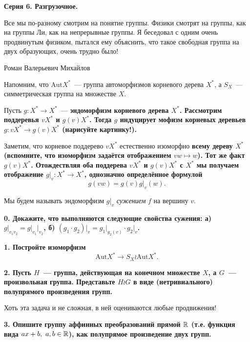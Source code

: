 \documentclass[11pt]{extarticle}
\begin{document}
\begin{landscape}
\begin{multicols}{2}
	\columnbreak

	\centerline{\bf{Серия 6. Разгрузочное. }}


	\epigraph{Все мы по-разному смотрим на понятие группы. Физики смотрят на группы, как на группы Ли, как на непрерывные группы. Я беседовал с одним очень продвинутым физиком, пытался ему объяснить, что такое свободная группа на двух образующих, очень трудно было!}{Роман Валерьевич Михайлов}

	Напомним, что $\mathrm{Aut}{X^*}$~--- группа автоморфизмов корневого дерева $X^*$, а $S_{X}$~---  симметрическая группа на множестве $X$.

	Пусть $g\colon X^* \to X^*$~--- \bf{эндоморфизм} корневого дерева $X^*$. Рассмотрим поддеревья $v X^*$ и $g(v) X^*$. Тогда $g$ индуцирует мофизм корневых деревьев $g\colon v X^* \to g(v) X^*$ (\bf{нарисуйте картинку!}). 

	Заметим, что корневое поддерево $v X^*$ естественно изоморфно \bf{всему} дереву $X^*$ (вспомните, что изоморфизм задаётся отображением $vw \mapsto w$). Тот же факт $g(v)X^*$. Отождествляя оба поддерева $v X^*$ и $g(v) X^*$ с $X^*$ мы получаем отображение $g\vert_{v} \colon X^* \to X^*$, однозначно определённое формулой 
	\[
		g(vw) = g(v) g\vert_{v}(w).
	\]

	Мы будем называть эндоморфизм $g\vert_{v}$ \emph{сужением} $f$ на вершину $v$.

	\bf{0.} Докажите, что выполняются следующие свойства сужения: а) $g\vert_{v_1 v_2} = g\vert_{v_1}\vert_{v_2}$, б) $(g_1 \cdot g_2)\vert_{v} = g_1\vert_{g_2(v)} \cdot g_2\vert_{v}$. 

	\bf{1.} Постройте изоморфизм 
	\[
		\mathrm{Aut}{X^*} \to S_{X} \wr \mathrm{Aut}{X^*}. 
	\]

	\bf{2.} Пусть $H$~--- группа, действующая на конечном множестве $X$, а $G$~--- произвольная группа. Представьте $H \wr G$ в виде (нетривиального) полупрямого произведения групп. 
	
	 Хоть эта задача и не сложная, в ней оцениваются любые продвижения! 

	 \bf{3.} Опишите группу аффинных преобразований прямой $\mathbb{R}$ (т.е. функция вида $ax + b, \ a, b \in \mathbb{R}$), как полупрямое произведение двух групп.
	

 	

	\end{multicols}
	\end{landscape}
\end{document}
